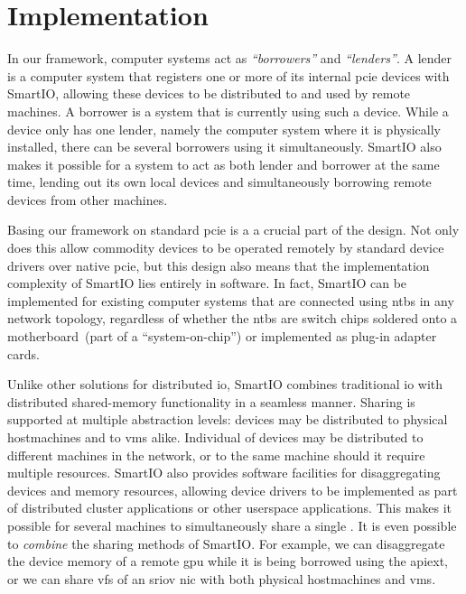 \section{Implementation}\label{sec:implementation}
In our framework, computer systems act as \emph{``\glspl{borrower}''} and \emph{``\glspl{lender}''}.
%
A \gls{lender} is a computer system that registers one or more of its internal \gls{pcie} devices with SmartIO, allowing these devices to be distributed to and used by remote machines.
%
A \gls{borrower} is a system that is currently using such a device. 
%
While a device only has one \gls{lender}, namely the computer system where it is physically installed, there can be several \glspl{borrower} using it simultaneously.
%
SmartIO also makes it possible for a system to act as both \gls{lender} and \gls{borrower} at the same time, lending out its own local devices and simultaneously borrowing remote devices from other machines.



Basing our framework on standard \gls{pcie} is a a crucial part of the design.
%
Not only does this allow commodity devices to be operated remotely by standard device drivers over native \gls{pcie}, but this design also means that the implementation complexity of SmartIO lies entirely in software.
%
In fact, SmartIO can be implemented for existing computer systems that are connected using \glspl{ntb} in any network topology, regardless of whether the \glspl{ntb} are switch chips soldered onto a motherboard~(part of a ``system-on-chip'') or implemented as plug-in adapter cards.



Unlike other solutions for distributed \gls{io}, SmartIO combines traditional \gls{io} with distributed shared-memory functionality in a seamless manner.
%
Sharing is supported at multiple abstraction levels:
%
devices may be distributed to physical \glspl{hostmachine} and to \glspl{vm} alike.
%
Individual  of  devices may be distributed to different machines in the network, or to the same machine should it require multiple resources.
%
SmartIO also provides software facilities for \gls{disaggregating} devices and memory resources, allowing device drivers to be implemented as part of distributed cluster applications or other \gls{userspace} applications. 
%
This makes it possible for several machines to simultaneously share a single .
%
It is even possible to \emph{combine} the sharing methods of SmartIO. 
%
For example, we can \gls{disaggregate} the device memory of a remote \gls{gpu} while it is being borrowed using the \gls{apiext}, or we can share \glspl{vf} of an \gls{sriov} \gls{nic} with both physical \glspl{hostmachine} and \glspl{vm}.


